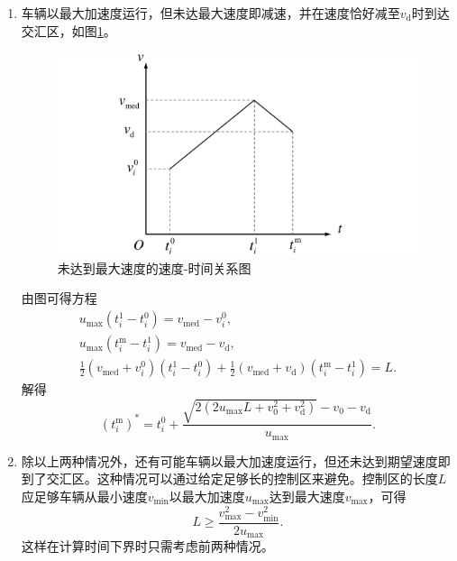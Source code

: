 \begin{enumerate}[label=(\arabic*)]
\item 车辆以最大加速度运行，但未达最大速度即减速，并在速度恰好减至$v_\mathrm{d}$时到达交汇区，如图\ref{fig:vmed}。
\begin{figure}[htbp]
\centering
\includegraphics[width=12cm]{figures/vmed.pdf}
\caption{未达到最大速度的速度-时间关系图}
\label{fig:vmed}
\end{figure}

由图可得方程
\begin{gather}
u_{\max}(t_i^1-t_i^0)=v_\mathrm{med}-v_i^0,\\
u_{\max}(t_i^\mathrm{m}-t_i^1)=v_\mathrm{med}-v_\mathrm{d},\\
\frac12(v_\mathrm{med}+v_i^0)(t_i^1-t_i^0) + \frac12(v_\mathrm{med}+v_\mathrm{d})(t_i^\mathrm{m}-t_i^1) = L.
\end{gather}
解得
\begin{equation}
(t_i^\mathrm{m})^*=t_i^0+\frac{\sqrt{2(2u_{\max}L+v_0^2+v_\mathrm{d}^2)}-v_0-v_\mathrm{d}}{u_{\max}}.
\end{equation}
\item 除以上两种情况外，还有可能车辆以最大加速度运行，但还未达到期望速度即到了交汇区。这种情况可以通过给定足够长的控制区来避免。控制区的长度$L$应足够车辆从最小速度$v_{\min}$以最大加速度$u_{\max}$达到最大速度$v_{\max}$，可得
\begin{equation}
L\geq \frac{v_{\max}^2-v_{\min}^2}{2u_{\max}}.
\end{equation}
这样在计算时间下界时只需考虑前两种情况。
\end{enumerate}

